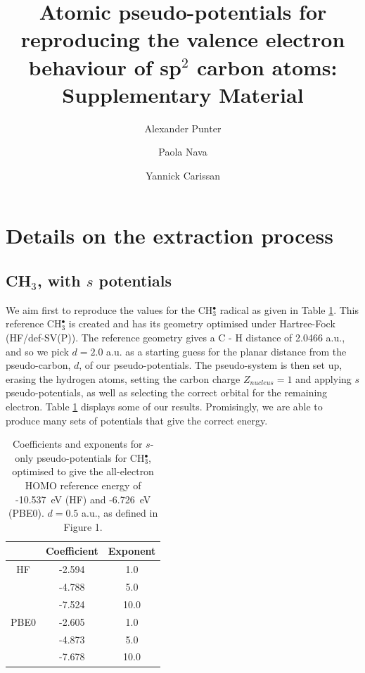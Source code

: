 \documentclass[aip]{revtex4-1}
\begin{document}
\renewcommand{\thetable}{S-\Roman{table}}
\renewcommand{\thefigure}{S-\Roman{figure}}

\title{Atomic pseudo-potentials for reproducing the valence electron behaviour of sp$^2$ carbon atoms: Supplementary Material}
\author{Alexander Punter}
\author{Paola Nava}
\author{Yannick Carissan}

\maketitle

\tableofcontents

\section*{Details on the extraction process}
\subsection*{CH\(_{3}\), with \(s\) potentials}

We aim first to reproduce the values for the CH\(^{\bullet}_{3}\) radical as given in Table \ref{table:ch3_s_potentials}. 
This reference CH\(^{\bullet}_{3}\) is created and has its geometry optimised under Hartree-Fock (HF/def-SV(P)). The reference geometry gives a C - H distance of 2.0466 a.u., and so we pick \(d = 2.0\) a.u. as a starting guess for the planar distance from the pseudo-carbon, \(d\), of our pseudo-potentials. The pseudo-system is then set up, erasing the hydrogen atoms, setting the carbon charge \(Z_{nucleus} = 1\) and applying \(s\) pseudo-potentials, as well as selecting the correct orbital for the remaining electron. Table \ref{table:ch3_s_potentials} displays some of our results. Promisingly, we are able to produce many sets of potentials that give the correct energy.

\begin{table}[ht]
\caption{Coefficients and exponents for \(s\)-only pseudo-potentials for CH\(^{\bullet}_{3}\), optimised to give 
the all-electron HOMO reference energy of  -10.537~eV (HF) and -6.726~eV (PBE0). 
\(d = 0.5\) a.u., as defined in Figure 1.}
\label{table:ch3_s_potentials}
\begin{tabular}{c c c}
\hline\hline
 & Coefficient & Exponent \\ 
\hline
HF & -2.594 & 1.0 \\
 & -4.788 & 5.0 \\
 & -7.524 & 10.0 \\
\hline
PBE0 & -2.605 & 1.0 \\
 & -4.873 & 5.0 \\
 & -7.678 & 10.0 \\
\hline\hline
\end{tabular}
\end{table}
\end{document}
